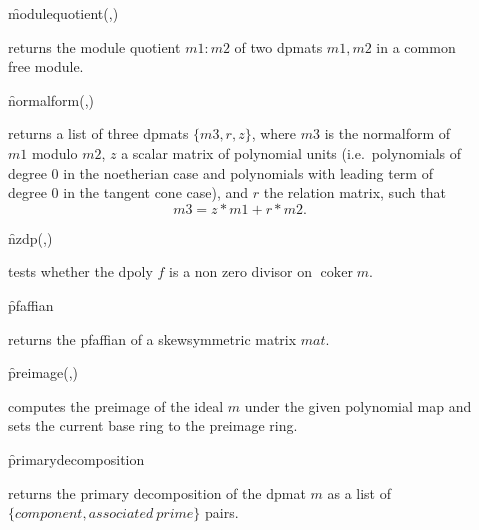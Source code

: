 \begin{description}
\item[]
  \begin{syntax}
    \f{modulequotient}(,)
  \end{syntax}
  \hypertarget{operator:MODULEQUOTIENT}{}
returns the module quotient $m1:m2$ of two dpmats $m1,m2$ in a
common free module.

\item[]
  \begin{syntax}
    \f{normalform}(,)
  \end{syntax}
  \hypertarget{operator:NORMALFORM}{}
returns a list of three dpmats $\{m3,r,z\}$, where $m3$ is the
normalform of $m1$ modulo $m2$, $z$ a scalar matrix of polynomial
units (i.e.\ polynomials of degree 0 in the noetherian case and
polynomials with leading term of degree 0 in the tangent cone case),
and $r$ the relation matrix, such that \[m3=z*m1+r*m2.\]

\item[]
  \begin{syntax}
    \f{nzdp}(,)
  \end{syntax}
  \hypertarget{operator:NZDP}{}
tests whether the dpoly $f$ is a non zero divisor on $\mathop{\mathrm{coker}}
m$.

\item[]
  \begin{syntax}
    \f{pfaffian} 
  \end{syntax}
  \hypertarget{operator:PFAFFIAN}{}
returns the pfaffian of a skewsymmetric matrix $mat$.

\item[]
  \begin{syntax}
    \f{preimage}(,)
  \end{syntax}
  \hypertarget{operator:PREIMAGE}{}
  computes the preimage of the ideal $m$ under the given
polynomial map and sets the current base ring to the preimage ring.

\item[]
  \begin{syntax}
    \f{primarydecomposition} 
  \end{syntax}
  \hypertarget{operator:PRIMARYDECOMPOSITION}{}
returns the primary decomposition of the dpmat $m$ as a list of
$\{component, associated\ prime\}$ pairs.


\end{description}
